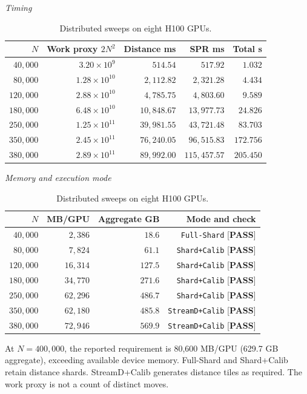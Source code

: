 \begin{table}[!htbp]
\end{table}

\begin{table}[!htbp]
\centering\small
\setlength{\tabcolsep}{4pt}
\caption{Distributed sweeps on eight H100 GPUs.}
\label{tab:h100_scaling}
\par\smallskip
\textit{Timing}\par\smallskip
\begin{tabular}{@{}rrrrr@{}}
\toprule
$N$ & Work proxy $2N^2$ & Distance ms & SPR ms & Total s\\
\midrule
$40{,}000$ & $3.20 \times 10^9$ & $514.54$ & $517.92$ & $\mathbf{1.032}$\\
$80{,}000$ & $1.28 \times 10^{10}$ & $2{,}112.82$ & $2{,}321.28$ & $\mathbf{4.434}$\\
$120{,}000$ & $2.88 \times 10^{10}$ & $4{,}785.75$ & $4{,}803.60$ & $\mathbf{9.589}$\\
$180{,}000$ & $6.48 \times 10^{10}$ & $10{,}848.67$ & $13{,}977.73$ & $\mathbf{24.826}$\\
$250{,}000$ & $1.25 \times 10^{11}$ & $39{,}981.55$ & $43{,}721.48$ & $\mathbf{83.703}$\\
$350{,}000$ & $2.45 \times 10^{11}$ & $76{,}240.05$ & $96{,}515.83$ & $\mathbf{172.756}$\\
$380{,}000$ & $2.89 \times 10^{11}$ & $89{,}992.00$ & $115{,}457.57$ & $\mathbf{205.450}$\\
\bottomrule
\end{tabular}
\par\smallskip
\textit{Memory and execution mode}\par\smallskip
\begin{tabular}{@{}rrrr@{}}
\toprule
$N$ & MB/GPU & Aggregate GB & Mode and check\\
\midrule
$40{,}000$ & $2{,}386$ & $18.6$ & \texttt{Full-Shard} [\textbf{PASS}]\\
$80{,}000$ & $7{,}824$ & $61.1$ & \texttt{Shard+Calib} [\textbf{PASS}]\\
$120{,}000$ & $16{,}314$ & $127.5$ & \texttt{Shard+Calib} [\textbf{PASS}]\\
$180{,}000$ & $34{,}770$ & $271.6$ & \texttt{Shard+Calib} [\textbf{PASS}]\\
$250{,}000$ & $62{,}296$ & $486.7$ & \texttt{Shard+Calib} [\textbf{PASS}]\\
$350{,}000$ & $62{,}180$ & $485.8$ & \texttt{StreamD+Calib} [\textbf{PASS}]\\
$380{,}000$ & $72{,}946$ & $569.9$ & \texttt{StreamD+Calib} [\textbf{PASS}]\\
\bottomrule
\end{tabular}
\par\medskip\begin{minipage}{\linewidth}\footnotesize At $N=400{,}000$, the reported requirement is 80,600 MB/GPU (629.7 GB aggregate), exceeding available device memory. Full-Shard and Shard+Calib retain distance shards. StreamD+Calib generates distance tiles as required. The work proxy is not a count of distinct moves.\end{minipage}
\end{table}
